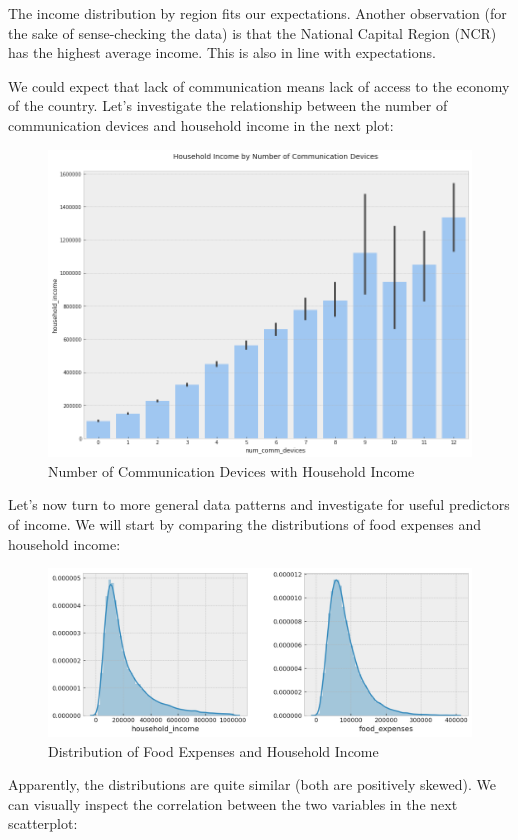 \documentclass{article}
\begin{document}
The income distribution by region fits our expectations. Another observation (for the sake of sense-checking the data) is that the National Capital Region (NCR) has the highest average income. This is also in line with expectations.

We could expect that lack of communication means lack of access to the economy of the country. Let's investigate the relationship between the number of communication devices and household income in the next plot:

\begin{figure}[H]
\caption{Number of Communication Devices with Household Income}
\centering
\includegraphics[width = 0.7 \textwidth]{household_income_comm_devices}
\end{figure}

Let's now turn to more general data patterns and investigate for useful predictors of income. We will start by comparing the distributions of food expenses and household income:

\begin{figure}[H]
\caption{Distribution of Food Expenses and Household Income}
\centering
\includegraphics[width = 0.7 \textwidth]{food_expenses_income_dist}
\end{figure}

Apparently, the distributions are quite similar (both are positively skewed). We can visually inspect the correlation between the two variables in the next scatterplot:
\end{document}
